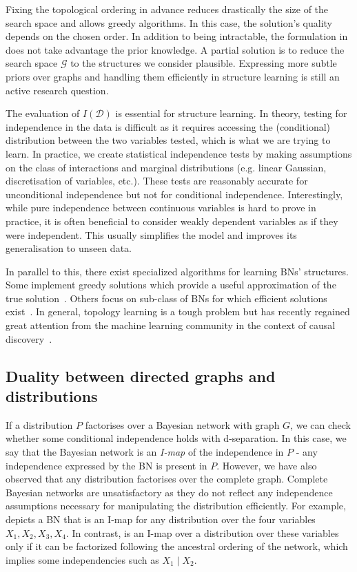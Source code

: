 Fixing the topological ordering in advance reduces drastically the size of the search space and allows greedy algorithms. In this case, the solution's quality depends on the chosen order. In addition to being intractable, the formulation in  does not take advantage the prior knowledge. A partial solution is to reduce the search space $\mathcal{G}$ to the structures we consider plausible. Expressing more subtle priors over graphs and handling them efficiently in structure learning is still an active research question.

The evaluation of $I(\mathcal{D})$ is essential for structure learning. In theory, testing for independence in the data is difficult as it requires accessing the (conditional) distribution between the two variables tested, which is what we are trying to learn. In practice, we create statistical independence tests by making assumptions on the class of interactions and marginal distributions (e.g. linear Gaussian, discretisation of variables, etc.). These tests are reasonably accurate for unconditional independence but not for conditional independence. Interestingly, while pure independence between continuous variables is hard to prove in practice, it is often beneficial to consider weakly dependent variables as if they were independent. This usually simplifies the model and improves its generalisation to unseen data.

In parallel to this, there exist specialized algorithms for learning BNs' structures. Some implement greedy solutions which provide a useful approximation of the true solution~\citep{tsamardinos2006max}. Others focus on sub-class of BNs for which efficient solutions exist~\citep{cooper1992Bayesian, chow1968approximating}. In general, topology learning is a tough problem but has recently regained great attention from the machine learning community in the context of causal discovery~\citep{khemakhem_causal_2020, balgi2022counterfactual, vowels2021d, brouillard2020differentiable}.


\subsection{Duality between directed graphs and distributions}
If a distribution $P$ factorises over a Bayesian network with graph $G$, we can check whether some conditional independence holds with d-separation. In this case, we say that the Bayesian network is an \textit{I-map} of the independence in $P$ - any independence expressed by the BN is present in $P$. However, we have also observed that any distribution factorises over the complete graph. Complete Bayesian networks are unsatisfactory as they do not reflect any independence assumptions necessary for manipulating the distribution efficiently. For example,  depicts a BN that is an I-map for any distribution over the four variables $X_1, X_2, X_3, X_4$. In contrast,  is an I-map over a distribution over these variables only if it can be factorized following the ancestral ordering of the network, which implies some independencies such as $X_1 \mid X_2$.

